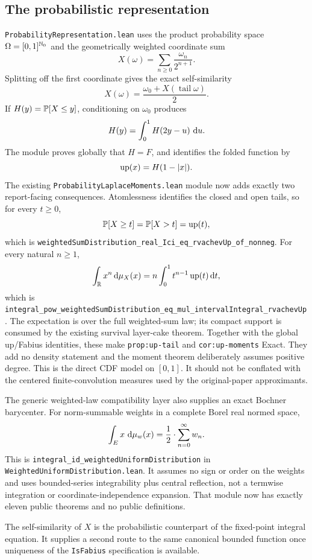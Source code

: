 \documentclass[11pt,oneside]{article}
\theoremstyle{definition}
\theoremstyle{remark}
\begin{document}
\subsection{The probabilistic representation}
\nolinkurl{ProbabilityRepresentation.lean} uses the product probability space
\(\Omega=[0,1]^{\mathbb{N}_{0}}\) and the geometrically weighted coordinate sum
\[
  X(\omega)=\sum_{n\geq0}\frac{\omega_n}{2^{n+1}}.
\]
Splitting off the first coordinate gives the exact self-similarity
\[
  X(\omega)=\frac{\omega_0+X(\operatorname{tail}\omega)}2.
\]
If \(H(y)=\mathbb{P}[X\leq y]\), conditioning on \(\omega_0\) produces
\[
  H(y)=\int_0^1 H(2y-u)\,\mathop{}\!\mathrm{d} u.
\]
The module proves globally that \(H=F\), and identifies the folded function by
\[
  \operatorname{up}(x)=H(1-|x|).
\]
The existing \nolinkurl{ProbabilityLaplaceMoments.lean} module now adds
exactly two report-facing consequences.  Atomlessness identifies the closed
and open tails, so for every \(t\geq0\),
\[
 \mathbb{P}[X\geq t]=\mathbb{P}[X>t]=\operatorname{up}(t),
\]
which is
\nolinkurl{weightedSumDistribution_real_Ici_eq_rvachevUp_of_nonneg}.  For
every natural \(n\geq1\),
\[
 \int_{\mathbb{R}}x^n\mathop{}\!\mathrm{d}\mu_X(x)
 =n\int_0^1t^{n-1}\operatorname{up}(t)\mathop{}\!\mathrm{d} t,
\]
which is
\nolinkurl{integral_pow_weightedSumDistribution_eq_mul_intervalIntegral_rvachevUp}.
The expectation is over the full weighted-sum law; its compact support is
consumed by the existing survival layer-cake theorem.  Together with the
global up/Fabius identities, these make \nolinkurl{prop:up-tail} and
\nolinkurl{cor:up-moments} Exact.  They add no density statement and the
moment theorem deliberately assumes positive degree.
This is the direct CDF model on \([0,1]\).  It should not be conflated with
the centered finite-convolution measures used by the original-paper
approximants.

The generic weighted-law compatibility layer also supplies an exact Bochner barycenter.
For norm-summable weights in a complete Borel real normed space,
\[
 \int_E x\,\mathop{}\!\mathrm{d}\mu_w(x)=\frac12\mathbin{\cdot}\sum_{n=0}^{\infty}w_n.
\]
This is
\nolinkurl{integral_id_weightedUniformDistribution} in
\nolinkurl{WeightedUniformDistribution.lean}.  It assumes no sign or order on the weights
and uses bounded-series integrability plus central reflection, not a termwise integration
or coordinate-independence expansion.  That module now has exactly eleven public theorems
and no public definitions.

The self-similarity of \(X\) is the probabilistic counterpart of the fixed-point integral equation.  It supplies a second route to the same canonical bounded function once uniqueness of the \nolinkurl{IsFabius} specification is available.
\end{document}
